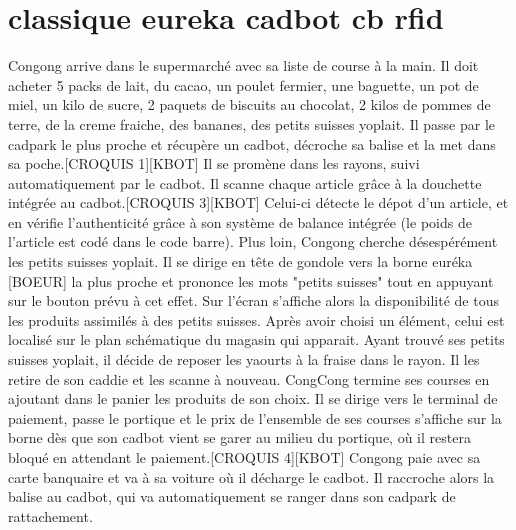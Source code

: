 \section{classique eureka cadbot cb rfid}

Congong arrive dans le supermarché avec sa liste de course à la main. Il doit acheter 5 packs de lait, du cacao, un poulet fermier, une baguette, un pot de miel, un kilo de sucre, 2 paquets de biscuits au chocolat, 2 kilos de pommes de terre, de la creme fraiche, des bananes, des petits suisses yoplait.
Il passe par le cadpark le plus proche et récupère un cadbot, décroche sa balise et la met dans sa poche.[CROQUIS 1][KBOT]
Il se promène dans les rayons, suivi automatiquement par le cadbot.
Il scanne chaque article grâce à la douchette intégrée au cadbot.[CROQUIS 3][KBOT]
Celui-ci détecte le dépot d'un article, et en vérifie l'authenticité grâce à son système 
de balance intégrée (le poids de l'article est codé dans le code barre).
Plus loin, Congong cherche désespérément les petits suisses yoplait.
Il se dirige en tête de gondole vers la borne euréka [BOEUR] la plus proche et prononce les mots "petits suisses" tout en appuyant sur le bouton prévu à cet effet.
Sur l'écran s'affiche alors la disponibilité de tous les produits assimilés à des petits suisses.
Après avoir choisi un élément, celui est localisé sur le plan schématique du magasin qui apparait.
Ayant trouvé ses petits suisses yoplait, il décide de reposer les yaourts à la fraise dans le rayon.
Il les retire de son caddie et les scanne à nouveau.
CongCong termine ses courses en ajoutant dans le panier les produits de son choix.
Il se dirige vers le terminal de paiement, passe le portique et le prix de l'ensemble de ses courses s'affiche sur la borne dès que son cadbot vient se garer au milieu du portique, où il restera bloqué en attendant le paiement.[CROQUIS 4][KBOT]
Congong paie avec sa carte banquaire et va à sa voiture où il décharge le cadbot.
Il raccroche alors la balise au cadbot, qui va automatiquement se ranger dans son cadpark de rattachement.
